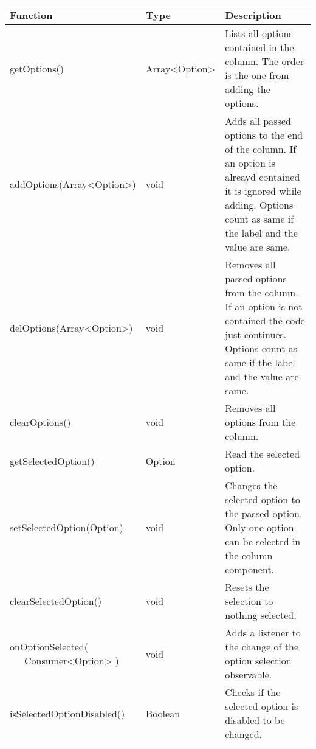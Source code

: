 \begin{table}[!htb] 
    \label{api:columnOptionsComponentReturn}
    \footnotesize
    \setlength\extrarowheight{4pt}
    \begin{tabular}{ p{5cm} p{3cm} p{5cm} }
        \toprule[1.2pt]
        \textbf{Function}                   & \textbf{Type}  & \textbf{Description} \\
        \midrule
        getOptions()                        & Array<Option>  & Lists all options contained in the column. 
                                                               The order is the one from adding the options. \\
        addOptions(Array<Option>)           & void           & Adds all passed options to the end of the column. 
                                                               If an option is alreayd contained it is ignored while adding. 
                                                               Options count as same if the label and the value are same. \\
        delOptions(Array<Option>)           & void           & Removes all passed options from the column. 
                                                               If an option is not contained the code just continues. 
                                                               Options count as same if the label and the value are same. \\
        clearOptions()                      & void           & Removes all options from the column. \\
        getSelectedOption()                 & Option         & Read the selected option. \\
        setSelectedOption(Option)           & void           & Changes the selected option to the passed option. 
                                                               Only one option can be selected in the column component. \\
        clearSelectedOption()               & void           & Resets the selection to nothing selected. \\
        \tbbr{
            onOptionSelected( \\
                \ \ \ Consumer<Option>
            )}                              & void           & Adds a listener to the change of the option selection observable. \\
        isSelectedOptionDisabled()          & Boolean        & Checks if the selected option is disabled to be changed. \\

\end{tabular}
\end{table}
